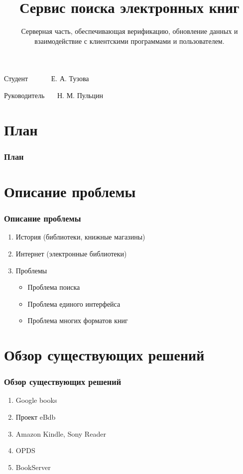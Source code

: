 \documentclass[handout]{beamer}
\title{Сервис поиска электронных книг }
\subtitle{Серверная часть, обеспечивающая верификацию, обновление данных и взаимодействие с клиентскими программами и пользователем.}
\date{}
\begin{document}
\begin{frame}
  \titlepage

  \begin{flushright}
    Студент~~~~~~  Е. А. Тузова
  
    Руководитель~~~  Н. М. Пульцин

  \end{flushright}
\end{frame}

\section*{План}
  \begin{frame}
    \frametitle{План}
    \tableofcontents[pausesections]

  \end{frame}

\section{Описание проблемы}
  \begin{frame}

    \frametitle{Описание проблемы}
    \begin{enumerate}
      \item История (библиотеки, книжные магазины)
      \item Интернет (электронные библиотеки)
      \item Проблемы
	      \begin{itemize}
		    \item Проблема поиска
            \item Проблема единого интерфейса
            \item Проблема многих форматов книг
	      \end{itemize}
      \end{enumerate}
  \end{frame}

\section{Обзор существующих решений}
  \begin{frame}
    \frametitle{Обзор существующих решений}

    \begin{enumerate}
      \item Google books
      \item Проект eBdb
      \item Amazon Kindle, Sony Reader
      \item OPDS
      \item BookServer
    \end{enumerate}
  \end{frame}
\end{document}
